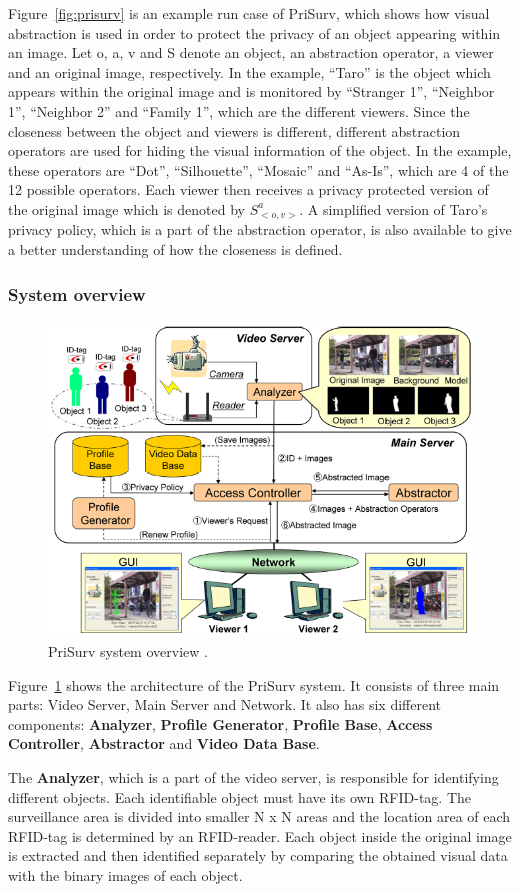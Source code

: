 \documentclass[conference]{IEEEtran}
\begin{document}
Figure~\ref{fig:prisurv} is an example run case of PriSurv, which shows how visual abstraction is used in order to protect the privacy of an object appearing within an image. Let o, a, v and S denote an object, an abstraction operator, a viewer and an original image, respectively. In the example, “Taro” is the object which appears within the original image and is monitored by “Stranger 1”, “Neighbor 1”, “Neighbor 2” and “Family 1”, which are the different viewers. Since the closeness between the object and viewers is different, different abstraction operators are used for hiding the visual information of the object. In the example, these operators are “Dot”, “Silhouette”, “Mosaic” and “As-Is”, which are 4 of the 12 possible operators. Each viewer then receives a privacy protected version of the original image which is denoted by $S_{<o, v>}^a$. A simplified version of Taro’s privacy policy, which is a part of the abstraction operator, is also available to give a better understanding of how the closeness is defined. 

\subsubsection{System overview}

\begin{figure}[t]
\centerline{\includegraphics[width=.5\textwidth]{img//prisurv_arch.png}}
\caption{PriSurv system overview \cite{chinomi2008PriSurv}.}
\label{fig:prisurv2}
\end{figure}

Figure~\ref{fig:prisurv2} shows the architecture of the PriSurv system. It consists of three main parts: Video Server, Main Server and Network. It also has six different components: \textbf{Analyzer}, \textbf{Profile Generator}, \textbf{Profile Base}, \textbf{Access Controller}, \textbf{Abstractor} and \textbf{Video Data Base}. 

The \textbf{Analyzer}, which is a part of the video server, is responsible for identifying different objects. Each identifiable object must have its own \ac{RFID}-tag. The surveillance area is divided into smaller N x N areas and the location area of each \ac{RFID}-tag is determined by an \ac{RFID}-reader. Each object inside the original image is extracted and then identified separately by comparing the obtained visual data with the binary images of each object. 
\end{document}
